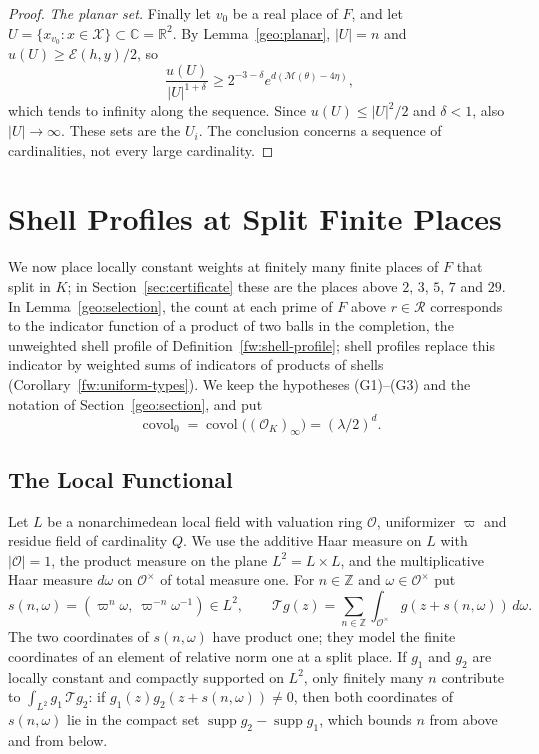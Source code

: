 \documentclass[11pt]{amsart}
\numberwithin{equation}{section}
\theoremstyle{definition}
\theoremstyle{remark}
\DeclareMathOperator{\covol}{covol}
\newcommand{\R}{\mathbb R}
\newcommand{\C}{\mathbb C}
\newcommand{\Z}{\mathbb Z}
\begin{document}
\begin{proof}
\emph{The planar set.} Finally let $v_0$ be a real place of $F$, and let
$U=\{x_{v_0}:x\in\mathcal X\}\subset\C=\R^2$. By
Lemma~\ref{geo:planar}, $|U|=n$ and $u(U)\ge\mathcal E(h,y)/2$, so
\[
 \frac{u(U)}{|U|^{1+\delta}}
 \ge2^{-3-\delta}e^{d(\mathcal M(\theta)-4\eta)},
\]
which tends to infinity along the sequence. Since $u(U)\le|U|^2/2$ and
$\delta<1$, also $|U|\to\infty$. These sets are the $U_i$. The
conclusion concerns a sequence of cardinalities, not every large
cardinality.
\end{proof}
\section{Shell Profiles at Split Finite Places}
\label{fw:section}

We now place locally constant weights at finitely many finite places of
$F$ that split in $K$; in Section~\ref{sec:certificate} these are the
places above $2$, $3$, $5$, $7$ and $29$. In
Lemma~\ref{geo:selection}, the count at each prime of $F$ above
$r\in\mathcal R$ corresponds to the indicator function of a product of
two balls in the completion, the unweighted shell profile of
Definition~\ref{fw:shell-profile}; shell profiles replace this indicator
by weighted sums of indicators of products of shells
(Corollary~\ref{fw:uniform-types}). We keep the hypotheses (G1)--(G3)
and the notation of Section~\ref{geo:section}, and put
\[
 \covol_0=\covol\bigl((\mathcal O_K)_\infty\bigr)=(\lambda/2)^d .
\]

\subsection{The Local Functional}

Let $L$ be a nonarchimedean local field with valuation ring $\mathcal
O$, uniformizer $\varpi$ and residue field of cardinality $Q$. We use
the additive Haar measure on $L$ with $|\mathcal O|=1$, the product
measure on the plane $L^2=L\times L$, and the multiplicative Haar
measure $d\omega$ on $\mathcal O^\times$ of total measure one. For $n\in\Z$
and $\omega\in\mathcal O^\times$ put
\[
 s(n,\omega)=(\varpi^n\omega,\ \varpi^{-n}\omega^{-1})\in L^2,\qquad
 \mathcal Tg(z)=\sum_{n\in\Z}\int_{\mathcal O^\times}g(z+s(n,\omega))\,d\omega .
\]
The two coordinates of $s(n,\omega)$ have product one; they model the
finite coordinates of an element of relative norm one at a split place.
If $g_1$ and $g_2$ are locally constant and compactly supported on
$L^2$, only finitely many $n$ contribute to $\int_{L^2}g_1\,\mathcal
Tg_2$: if $g_1(z)g_2(z+s(n,\omega))\ne0$, then both coordinates of
$s(n,\omega)$ lie in the compact set
$\operatorname{supp}g_2-\operatorname{supp}g_1$, which bounds $n$ from
above and from below.
\end{document}
